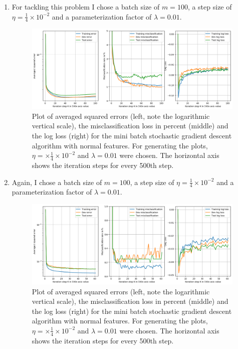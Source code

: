 \documentclass[12pt]{article}
\begin{document}
\begin{enumerate}
	\item 
	For tackling this problem I chose a batch size of $m=100$, a step size of $\eta=\frac{1}{4}\times 10^{-2}$ and a parameterization factor of $\lambda=0.01$.
	\begin{figure}[h]
		\centering
		\includegraphics[width=1\linewidth]{./Problem_2/Problem_2.1_normal_features.png}
		\caption{Plot of averaged squared errors (left, note the logarithmic vertical scale), the misclassification loss in percent (middle) and the log loss (right) for the mini batch stochastic gradient descent algorithm with normal features. For generating the plots, $\eta = \times \frac{1}{4}\times 10^{-2}$ and $\lambda=0.01$ were chosen. The horizontal axis shows the iteration steps for every 500th step.}
		\label{fig:2.1}
	\end{figure}
	\item 
	Again, I chose a batch size of $m=100$, a step size of $\eta=\frac{1}{4}\times 10^{-2}$ and a parameterization factor of $\lambda=0.01$.
	\begin{figure}[h]
		\centering
		\includegraphics[width=1\linewidth]{./Problem_2/Problem_2.1_pol_features.png}
		\caption{Plot of averaged squared errors (left, note the logarithmic vertical scale), the misclassification loss in percent (middle) and the log loss (right) for the mini batch stochastic gradient descent algorithm with normal features. For generating the plots, $\eta = \times \frac{1}{4}\times 10^{-2}$ and $\lambda=0.01$ were chosen. The horizontal axis shows the iteration steps for every 500th step.}
		\label{fig:2.2}
	\end{figure}
\end{enumerate}
\end{document}
